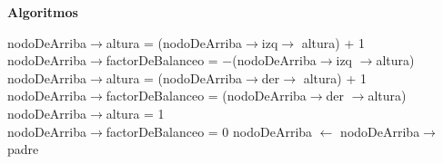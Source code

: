 \documentclass[a4paper,10pt]{article}
\newenvironment{Algoritmos}{%
  \vspace*{2ex}%
  \noindent\textbf{\Large Algoritmos}%
  \vspace*{2ex}%
}{}
\begin{document}
\begin{Algoritmos}
\begin{algorithm}[H]
{{    {
    {nodoDeArriba$\rightarrow$altura = (nodoDeArriba$\rightarrow$izq$\rightarrow$ altura) + 1 \\
    nodoDeArriba$\rightarrow$factorDeBalanceo = $-$(nodoDeArriba$\rightarrow$izq $\rightarrow$altura)}
    {
    {nodoDeArriba$\rightarrow$altura = (nodoDeArriba$\rightarrow$der$\rightarrow$ altura) + 1 \\
    nodoDeArriba$\rightarrow$factorDeBalanceo = (nodoDeArriba$\rightarrow$der $\rightarrow$altura)}
    {nodoDeArriba$\rightarrow$altura = 1\\
    nodoDeArriba$\rightarrow$factorDeBalanceo = 0}
    }
    }
    {nodoDeArriba $\leftarrow$ nodoDeArriba$\rightarrow$padre}
    }
    }
\end{algorithm}


\newpage
\begin{algorithm}[H]



\end{algorithm}
\end{Algoritmos}
\end{document}
